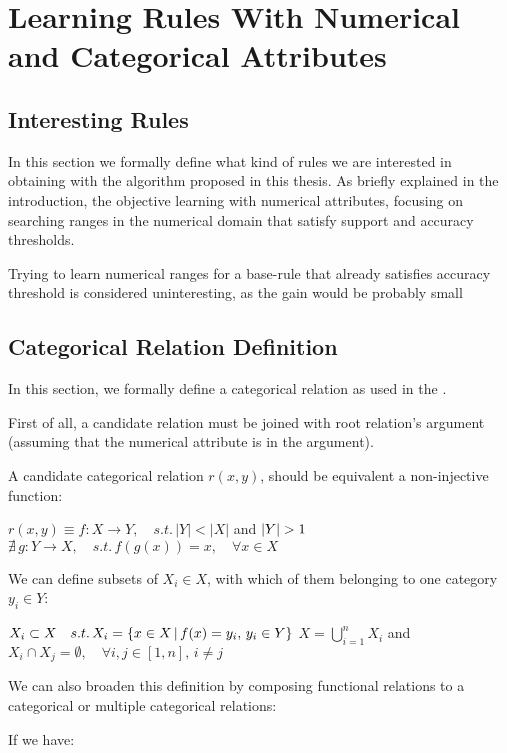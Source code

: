 \chapter{Learning Rules With Numerical and Categorical Attributes}
\label{cl:intro}

\section{Interesting Rules}

In this section we formally define what kind of rules we are interested in obtaining with the algorithm proposed in
this thesis. As briefly explained in the introduction, the objective learning with numerical attributes, focusing on searching ranges in the numerical domain that satisfy support and accuracy thresholds.

Trying to learn numerical ranges for a base-rule that already satisfies accuracy threshold is considered uninteresting, as the gain would be probably small

\section{Categorical Relation Definition}

In this section, we formally define a categorical relation as used in the \graphname. 

First of all, a candidate relation must be joined with root relation's  argument (assuming that the numerical
attribute is in the  argument). 

A candidate categorical relation $r(x,y)$, should be equivalent a non-injective function:

$r(x,y) \equiv f : X \rightarrow Y , \quad s.t. \, |Y|<|X| $ and $ |Y|>1 \newline $
$\nexists \, g : Y \rightarrow X , \quad s.t. \, f(g(x))=x , \quad \forall x \in X$

We can define subsets of $X_i \in X$, with which of them belonging to one category $y_i \in Y$:

$X_i \subset X \quad s.t. \, X_i = \{x \in X \,|\, f(x)=y_i ,\, y_i \in Y\} \newline $
$X = \bigcup_{i=1}^{n} X_i $ and $ X_i \cap X_j = \emptyset ,\quad \forall i,j \in [1,n] ,\, i \neq j$

We can also broaden this definition by composing functional relations to a categorical or multiple categorical
relations:

If we have:

